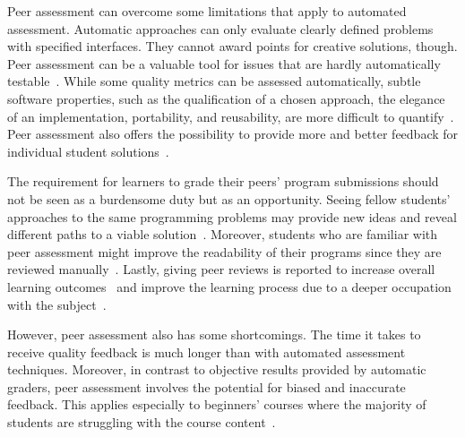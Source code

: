 Peer assessment can overcome some limitations that apply to automated assessment. Automatic approaches can only evaluate clearly defined problems with specified interfaces. They cannot award points for creative solutions, though. Peer assessment can be a valuable tool for issues that are hardly automatically testable~\cite{safran2008collaborative}. While some quality metrics can be assessed automatically, subtle software properties, such as the qualification of a chosen approach, the elegance of an implementation, portability, and reusability, are more difficult to quantify~\cite{douce2005automatic}. Peer assessment also offers the possibility to provide more and better feedback for individual student solutions~\cite{safran2008collaborative}.

The requirement for learners to grade their peers' program submissions should not be seen as a burdensome duty but as an opportunity. Seeing fellow students' approaches to the same programming problems may provide new ideas and reveal different paths to a viable solution~\cite{hamalainen2009use,reily2009two}. Moreover, students who are familiar with peer assessment might improve the readability of their programs since they are reviewed manually~\cite{hamalainen2009use}. Lastly, giving peer reviews is reported to increase overall learning outcomes~\cite{reily2009two} and improve the learning process due to a deeper occupation with the subject~\cite{safran2008collaborative}.

However, peer assessment also has some shortcomings. The time it takes to receive quality feedback is much longer than with automated assessment techniques. Moreover, in contrast to objective results provided by automatic graders, peer assessment involves the potential for biased and inaccurate feedback. This applies especially to beginners' courses where the majority of students are struggling with the course content~\cite{singh2013automated}.
